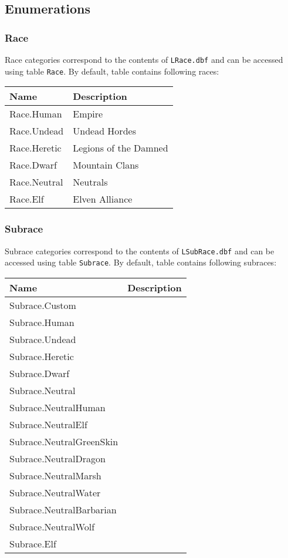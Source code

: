 \subsection{Enumerations}
\subsubsection{Race}
\label{RaceCategory}
Race categories correspond to the contents of \texttt{LRace.dbf} and can be accessed using table \texttt{Race}.
By default, table contains following races:\\
\begin{tabularx}{\linewidth}{| l | X |}
\hline
\textbf{Name} & \textbf{Description} \\
\hline
Race.Human & Empire\\
\hline
Race.Undead & Undead Hordes\\
\hline
Race.Heretic & Legions of the Damned\\
\hline
Race.Dwarf & Mountain Clans\\
\hline
Race.Neutral & Neutrals\\
\hline
Race.Elf & Elven Alliance\\
\hline
\end{tabularx}

\subsubsection{Subrace}
\label{SubraceCategory}
Subrace categories correspond to the contents of \texttt{LSubRace.dbf} and can be accessed using table \texttt{Subrace}.
By default, table contains following subraces:\\
\begin{tabularx}{\linewidth}{| l | X |}
\hline
\textbf{Name} & \textbf{Description} \\
\hline
Subrace.Custom &\\
\hline
Subrace.Human &\\
\hline
Subrace.Undead &\\
\hline
Subrace.Heretic &\\
\hline
Subrace.Dwarf &\\
\hline
Subrace.Neutral &\\
\hline
Subrace.NeutralHuman &\\
\hline
Subrace.NeutralElf &\\
\hline
Subrace.NeutralGreenSkin &\\
\hline
Subrace.NeutralDragon &\\
\hline
Subrace.NeutralMarsh &\\
\hline
Subrace.NeutralWater &\\
\hline
Subrace.NeutralBarbarian &\\
\hline
Subrace.NeutralWolf &\\
\hline
Subrace.Elf &\\
\hline
\end{tabularx}

